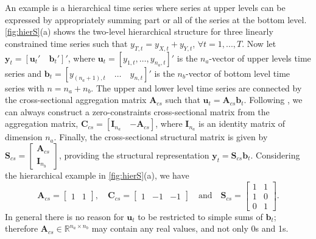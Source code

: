 \documentclass[review, 11pt]{elsarticle}
\newcommand{\bvet}{\bm{b}}
\newcommand{\uvet}{\bm{u}}
\newcommand{\yvet}{\bm{y}}
\newcommand{\Avet}{\bm{A}}
\newcommand{\Cvet}{\bm{C}}
\newcommand{\Ivet}{\bm{I}}
\newcommand{\Svet}{\bm{S}}
\theoremstyle{definition}
\begin{document}
An example is a hierarchical time series where series at upper levels can be expressed by appropriately summing part or all of the series at the bottom level. \autoref{fig:hierS}(a) shows the two-level hierarchical structure for three linearly constrained time series such that $y_{T,t} = y_{X,t} + y_{Y,t}$, $\forall t = 1,...,T$. Now let $\yvet_t = \left[\uvet_t' \quad \bvet_t'\right]'$, where $\uvet_t = [y_{1,t}, \dots, y_{n_a,t}]'$ is the $n_a$-vector of upper levels time series and $\bvet_t = \left[y_{(n_a+1),t}\quad \dots \quad y_{n,t}\right]'$ is the $n_b$-vector of bottom level time series with $n = n_a+n_b$. The upper and lower level time series are connected by the cross-sectional aggregation matrix $\Avet_{cs}$ such that $\uvet_t = \Avet_{cs}\bvet_t$. Following \cite{giro2022}, we can always construct a zero-constraints cross-sectional matrix from the aggregation matrix, $\Cvet_{cs}=\left[\Ivet_{n_a} \quad {-\Avet_{cs}}\right]${\color{blue}, where $\Ivet_{n_a}$ is an identity matrix of dimension $n_a$}. Finally, the cross-sectional structural matrix is given by $\Svet_{cs} = \left[\begin{array}{c}
	\Avet_{cs}\\[-0.25cm]
	\Ivet_{n_b}
\end{array}\right]$, providing the structural representation \citep{hyndman2011} $\yvet_t = \Svet_{cs} \bvet_t$. Considering the hierarchical example in \autoref{fig:hierS}(a), we have
$$
	\Avet_{cs} = \begin{bmatrix} 1 & 1 \end{bmatrix}, \quad \Cvet_{cs} = \begin{bmatrix}1 & -1 & -1 \end{bmatrix} \quad \text{and} \quad \Svet_{cs} = \begin{bmatrix}
		1 & 1 \\[-0.25cm]
		1 & 0 \\[-0.25cm]
		0 & 1
	\end{bmatrix}.
$$
In general there is no reason for $\uvet_t$ to be restricted to simple sums of $\bvet_t$; therefore $\Avet_{cs} \in \mathbb{R}^{n_a\times n_b}$ may contain any real values, and not only 0s and 1s.
\end{document}
